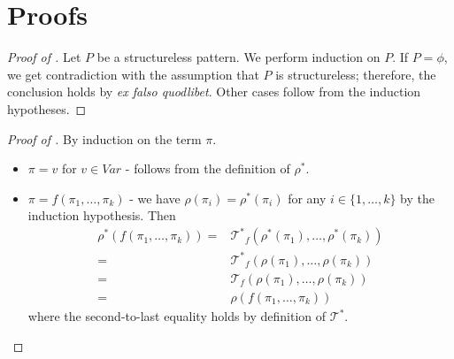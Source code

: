 \documentclass{article}
\begin{document}



\appendix

\section{Proofs}

\begin{proof}[Proof of ]
Let $P$ be a structureless pattern.
We perform induction on $P$.
If $P = \phi$, we get contradiction with the assumption that $P$ is structureless;
therefore, the conclusion holds by \emph{ex falso quodlibet}.
Other cases follow from the induction hypotheses.
\end{proof}


\begin{proof}[Proof of ]
    By induction on the term $\pi$.
    \begin{itemize}
        \item $\pi = v$ for $v \in \mathit{Var}$ - follows from the definition of $\rho^*$.
        \item $\pi = f(\pi_1, \ldots, \pi_k)$ - we have $\rho(\pi_i) = \rho^*(\pi_i)$ for any $i \in \{ 1, \ldots, k \}$
              by the induction hypothesis.
              Then
              \begin{align*}
                  \rho^*(f(\pi_1, \ldots, \pi_k)) 
                  = & {\mathcal{T}^*}_f(\rho^*(\pi_1), \ldots, \rho^*(\pi_k)) \\
                  = & {\mathcal{T}^*}_f(\rho(\pi_1), \ldots, \rho(\pi_k)) \\
                  = & \mathcal{T}_f(\rho(\pi_1), \ldots, \rho(\pi_k)) \\
                  = & \rho(f(\pi_1, \ldots, \pi_k))
              \end{align*}
              where the second-to-last equality holds by definition of $\mathcal{T}^*$.
    \end{itemize}
\end{proof}
\end{document}
